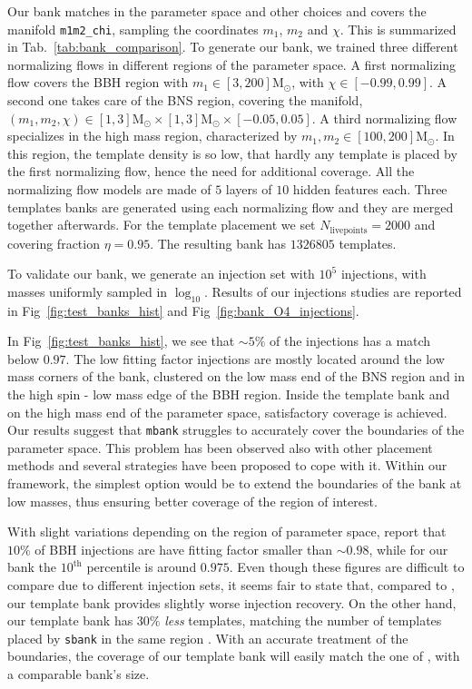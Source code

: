 \documentclass[twocolumn,showpacs,preprintnumbers,nofootinbib,prd,
superscriptaddress,10pt]{revtex4-2}
\newcommand{\stefano}[1]{{\textcolor{blue}{\texttt{SS: #1}} }}
\begin{document}
Our bank matches \cite{Sakon:2022ibh} in the parameter space and other choices and covers the manifold \texttt{m1m2\_chi}, sampling the coordinates $m_1$, $m_2$ and $\chi$. This is summarized in Tab.~\ref{tab:bank_comparison}.
To generate our bank, we trained three different normalizing flows in different regions of the parameter space. A first normalizing flow covers the BBH region with $m_1 \in [3,200] \mathrm{M_\odot}$, with $\chi \in [-0.99, 0.99]$. A second one takes care of the BNS region, covering the manifold, ${(m_1, m_2, \chi) \in [1,3]\mathrm{M_\odot}\times[1,3]\mathrm{M_\odot}\times [-0.05, 0.05]}$.
A third normalizing flow specializes in the high mass region, characterized by $m_1, m_2 \in [100,200] \mathrm{M_\odot}$. In this region, the template density is so low, that hardly any template is placed by the first normalizing flow, hence the need for additional coverage.
All the normalizing flow models are made of $5$ layers of $10$ hidden features each.
Three templates banks are generated using each normalizing flow and they are merged together afterwards.
For the template placement we set $N_\text{livepoints} = 2000$ and covering fraction $\eta = 0.95$.
The resulting bank has $1326805$ templates.

To validate our bank, we generate an injection set with $10^5$ injections, with masses uniformly sampled in $\log_{10}$.
Results of our injections studies are reported in Fig~\ref{fig:test_banks_hist} and Fig~\ref{fig:bank_O4_injections}.

In Fig~\ref{fig:test_banks_hist}, we see that $\sim 5\%$ of the injections has a match below $0.97$. The low fitting factor injections are mostly located around the low mass corners of the bank, clustered on the low mass end of the BNS region and in the high spin - low mass edge of the BBH region.
Inside the template bank and on the high mass end of the parameter space, satisfactory coverage is achieved.
Our results suggest that \texttt{mbank} struggles to accurately cover the boundaries of the parameter space. This problem has been observed also with other placement methods \cite{} and several strategies have been proposed \cite{} to cope with it. Within our framework, the simplest option would be to extend the boundaries of the bank at low masses, thus ensuring better coverage of the region of interest.

With slight variations depending on the region of parameter space, \cite{Sakon:2022ibh} report that $10\%$ of BBH injections are have fitting factor smaller than $\sim 0.98$, while for our bank the $10^\text{th}$ percentile is around $0.975$.
Even though these figures are difficult to compare due to different injection sets, it seems fair to state that, compared to \cite{Sakon:2022ibh}, our template bank provides slightly worse injection recovery.
On the other hand, our template bank has $30\%$ {\it less} templates, matching the number of templates placed by \texttt{sbank} in the same region \cite{Sakon:2022ibh}. With an accurate treatment of the boundaries, the coverage of our template bank will easily match the one of \cite{Sakon:2022ibh}, with a comparable bank's size.
\end{document}
